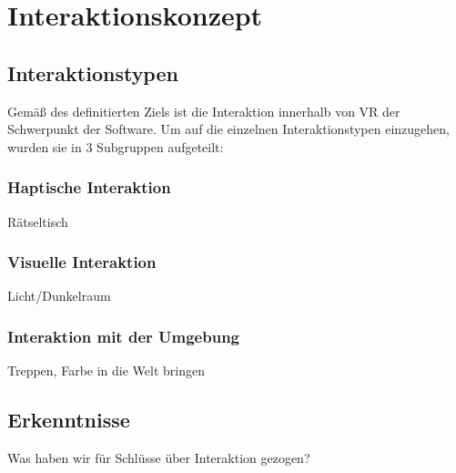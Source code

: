 \chapter{Interaktionskonzept}

\section{Interaktionstypen}
Gemäß des definitierten Ziels ist die Interaktion innerhalb von VR der Schwerpunkt der Software. Um auf die einzelnen Interaktionstypen einzugehen, wurden sie in 3 Subgruppen aufgeteilt:

\subsection{Haptische Interaktion}
Rätseltisch

\subsection{Visuelle Interaktion}
Licht/Dunkelraum

\subsection{Interaktion mit der Umgebung}
Treppen, Farbe in die Welt bringen


\section{Erkenntnisse}
Was haben wir für Schlüsse über Interaktion gezogen? 